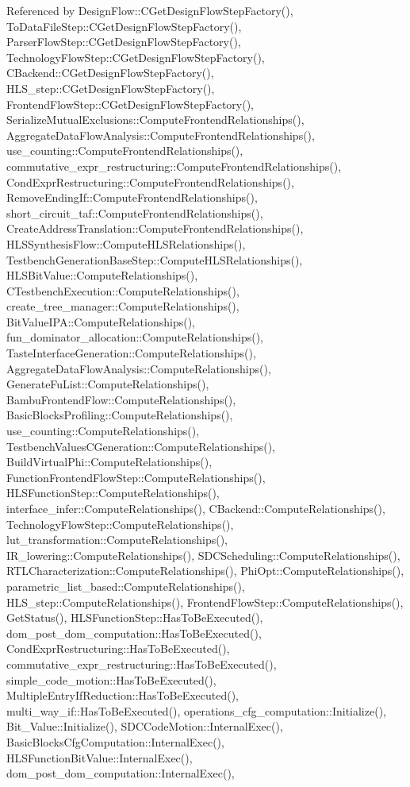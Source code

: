Referenced by Design\+Flow\+::\+C\+Get\+Design\+Flow\+Step\+Factory(), To\+Data\+File\+Step\+::\+C\+Get\+Design\+Flow\+Step\+Factory(), Parser\+Flow\+Step\+::\+C\+Get\+Design\+Flow\+Step\+Factory(), Technology\+Flow\+Step\+::\+C\+Get\+Design\+Flow\+Step\+Factory(), C\+Backend\+::\+C\+Get\+Design\+Flow\+Step\+Factory(), H\+L\+S\+\_\+step\+::\+C\+Get\+Design\+Flow\+Step\+Factory(), Frontend\+Flow\+Step\+::\+C\+Get\+Design\+Flow\+Step\+Factory(), Serialize\+Mutual\+Exclusions\+::\+Compute\+Frontend\+Relationships(), Aggregate\+Data\+Flow\+Analysis\+::\+Compute\+Frontend\+Relationships(), use\+\_\+counting\+::\+Compute\+Frontend\+Relationships(), commutative\+\_\+expr\+\_\+restructuring\+::\+Compute\+Frontend\+Relationships(), Cond\+Expr\+Restructuring\+::\+Compute\+Frontend\+Relationships(), Remove\+Ending\+If\+::\+Compute\+Frontend\+Relationships(), short\+\_\+circuit\+\_\+taf\+::\+Compute\+Frontend\+Relationships(), Create\+Address\+Translation\+::\+Compute\+Frontend\+Relationships(), H\+L\+S\+Synthesis\+Flow\+::\+Compute\+H\+L\+S\+Relationships(), Testbench\+Generation\+Base\+Step\+::\+Compute\+H\+L\+S\+Relationships(), H\+L\+S\+Bit\+Value\+::\+Compute\+Relationships(), C\+Testbench\+Execution\+::\+Compute\+Relationships(), create\+\_\+tree\+\_\+manager\+::\+Compute\+Relationships(), Bit\+Value\+I\+P\+A\+::\+Compute\+Relationships(), fun\+\_\+dominator\+\_\+allocation\+::\+Compute\+Relationships(), Taste\+Interface\+Generation\+::\+Compute\+Relationships(), Aggregate\+Data\+Flow\+Analysis\+::\+Compute\+Relationships(), Generate\+Fu\+List\+::\+Compute\+Relationships(), Bambu\+Frontend\+Flow\+::\+Compute\+Relationships(), Basic\+Blocks\+Profiling\+::\+Compute\+Relationships(), use\+\_\+counting\+::\+Compute\+Relationships(), Testbench\+Values\+C\+Generation\+::\+Compute\+Relationships(), Build\+Virtual\+Phi\+::\+Compute\+Relationships(), Function\+Frontend\+Flow\+Step\+::\+Compute\+Relationships(), H\+L\+S\+Function\+Step\+::\+Compute\+Relationships(), interface\+\_\+infer\+::\+Compute\+Relationships(), C\+Backend\+::\+Compute\+Relationships(), Technology\+Flow\+Step\+::\+Compute\+Relationships(), lut\+\_\+transformation\+::\+Compute\+Relationships(), I\+R\+\_\+lowering\+::\+Compute\+Relationships(), S\+D\+C\+Scheduling\+::\+Compute\+Relationships(), R\+T\+L\+Characterization\+::\+Compute\+Relationships(), Phi\+Opt\+::\+Compute\+Relationships(), parametric\+\_\+list\+\_\+based\+::\+Compute\+Relationships(), H\+L\+S\+\_\+step\+::\+Compute\+Relationships(), Frontend\+Flow\+Step\+::\+Compute\+Relationships(), Get\+Status(), H\+L\+S\+Function\+Step\+::\+Has\+To\+Be\+Executed(), dom\+\_\+post\+\_\+dom\+\_\+computation\+::\+Has\+To\+Be\+Executed(), Cond\+Expr\+Restructuring\+::\+Has\+To\+Be\+Executed(), commutative\+\_\+expr\+\_\+restructuring\+::\+Has\+To\+Be\+Executed(), simple\+\_\+code\+\_\+motion\+::\+Has\+To\+Be\+Executed(), Multiple\+Entry\+If\+Reduction\+::\+Has\+To\+Be\+Executed(), multi\+\_\+way\+\_\+if\+::\+Has\+To\+Be\+Executed(), operations\+\_\+cfg\+\_\+computation\+::\+Initialize(), Bit\+\_\+\+Value\+::\+Initialize(), S\+D\+C\+Code\+Motion\+::\+Internal\+Exec(), Basic\+Blocks\+Cfg\+Computation\+::\+Internal\+Exec(), H\+L\+S\+Function\+Bit\+Value\+::\+Internal\+Exec(), dom\+\_\+post\+\_\+dom\+\_\+computation\+::\+Internal\+Exec(), 